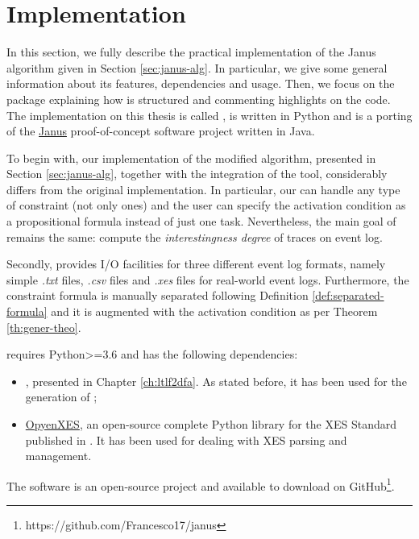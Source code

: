 \section{Implementation}\label{sec:janus-implementation}
In this section, we fully describe the practical implementation of the Janus algorithm given in Section \ref{sec:janus-alg}. In particular, we give some general information about its features, dependencies and usage. Then, we focus on the package explaining how is structured and commenting highlights on the code. The implementation on this thesis is called \janus, is written in Python and is a porting of the \href{https://github.com/Oneiroe/Janus}{Janus} proof-of-concept software project written in Java.

To begin with, our implementation of the modified algorithm, presented in Section \ref{sec:janus-alg}, together with the integration of the \LTLfToDFA tool, considerably differs from the original implementation. In particular, our \janus can handle any type of constraint (not only \declare ones) and the user can specify the activation condition as a propositional formula instead of just one task. Nevertheless, the main goal of \janus remains the same: compute the \textit{interestingness degree} of traces on event log.  

Secondly, \janus provides I/O facilities for three different event log formats, namely simple \textit{.txt} files, \textit{.csv} files and \textit{.xes} files for real-world event logs. Furthermore, the constraint formula is manually separated following Definition \ref{def:separated-formula} and it is augmented with the activation condition as per Theorem \ref{th:gener-theo}.

\janus requires Python>=3.6 and has the following dependencies:
\begin{itemize}
\item \LTLfToDFA, presented in Chapter \ref{ch:ltlf2dfa}. As stated before, it has been used for the generation of \DFAs;
\item \href{https://github.com/opyenxes/OpyenXes}{OpyenXES}, an open-source complete Python library for the XES Standard published in \citep{DBLP:conf/bpm/ValdiviesoLMS18}. It has been used for dealing with XES parsing and management.
\end{itemize} 
The \janus software is an open-source project and available to download on GitHub\footnote{https://github.com/Francesco17/janus}.
